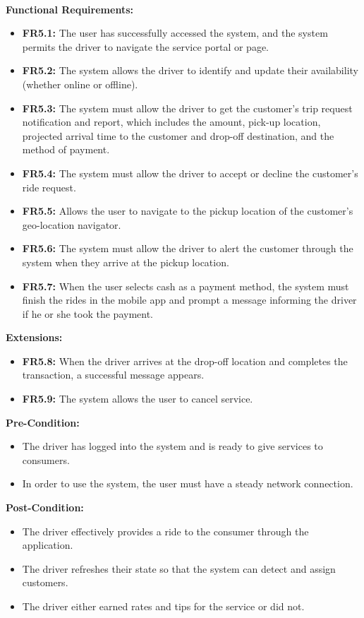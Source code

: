 \documentclass[9pt]{report}
\begin{document}
\textbf{\\Functional Requirements:}
\begin{itemize}
    \item \textbf{FR5.1:} The user has successfully accessed the system, and the system permits the driver to navigate the service portal or page.
    \item \textbf{FR5.2:} The system allows the driver to identify and update their availability (whether online or offline).
    \item \textbf{FR5.3:} The system must allow the driver to get the customer's trip request notification and report, which includes the amount, pick-up location, projected arrival time to the customer and drop-off destination, and the method of payment.
    \item \textbf{FR5.4:} The system must allow the driver to accept or decline the customer's ride request.
    \item \textbf{FR5.5:} Allows the user to navigate to the pickup location of the customer's geo-location navigator.
    \item \textbf{FR5.6:} The system must allow the driver to alert the customer through the system when they arrive at the pickup location.
    \item \textbf{FR5.7:} When the user selects cash as a payment method, the system must finish the rides in the mobile app and prompt a message informing the driver if he or she took the payment.
\end{itemize}
\textbf{Extensions:}
\begin{itemize}
    \item \textbf{FR5.8:} When the driver arrives at the drop-off location and completes the transaction, a successful message appears.
    \item \textbf{FR5.9:} The system allows the user to cancel service.
\end{itemize}
\textbf{Pre-Condition:} 
\begin{itemize}
    \item The driver has logged into the system and is ready to give services to consumers.
    \item In order to use the system, the user must have a steady network connection.
\end{itemize}
\textbf{Post-Condition:} 
\begin{itemize}
    \item The driver effectively provides a ride to the consumer through the application.
    \item The driver refreshes their state so that the system can detect and assign customers.
    \item The driver either earned rates and tips for the service or did not.
\end{itemize}
\end{document}
